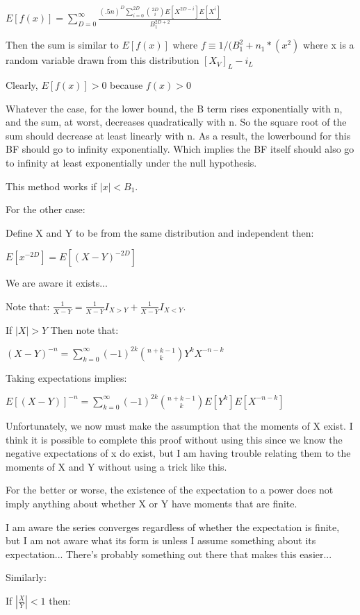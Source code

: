 \documentclass[11pt]{article}
\begin{document}
$E[f(x)] = \sum_{D=0}^\infty \frac{(.5n)^D \sum_{i=0}^{2D} \binom{2D}{i}E[X^{2D-i}]E[X^{i}]}{B_1^{2D+2}}$

Then the sum is similar to $E[f(x)]$ where $f \equiv 1 / (B_1^2 + n_1*(x^2)$ where x is a random variable drawn from this distribution $[X_V]_{L} - i_L$

Clearly, $E[f(x)] > 0$ because $f(x) > 0$

Whatever the case, for the lower bound, the B term rises exponentially with n, and the sum, at worst, decreases quadratically with n. So the square root of the sum should decrease at least linearly with n. As a result, the lowerbound for this BF should go to infinity exponentially. Which implies the BF itself should also go to infinity at least exponentially under the null hypothesis.

This method works if $|x| < B_1$. 

For the other case:

Define X and Y to be from the same distribution and independent then:

$E[x^{-2D}] = E[(X-Y)^{-2D}]$

We are aware it exists...

Note that: $\frac{1}{X-Y} = \frac{1}{X-Y} I_{X > Y} + \frac{1}{X-Y} I_{X < Y}$. 

If $|X| > Y$ Then note that:

$(X - Y)^{-n} = \sum_{k=0}^{\infty} (-1)^{2k} \binom{n+k-1}{k}{Y^k}{X^{-n-k}}$

Taking expectations implies:

$E[(X - Y)]^{-n} = \sum_{k=0}^{\infty} (-1)^{2k} \binom{n+k-1}{k}E[{Y^k}]E[{X^{-n-k}}]$

Unfortunately, we now must make the assumption that the moments of X exist. I think it is possible to complete this proof without using this since we know the negative expectations of x do exist, but I am having trouble relating them to the moments of X and Y without using a trick like this.

For the better or worse, the existence of the expectation to a power does not imply anything about whether X or Y have moments that are finite.

I am aware the series converges regardless of whether the expectation is finite, but I am not aware what its form is unless I assume something about its expectation... There's probably something out there that makes this easier...

Similarly:

If $|\frac{X}  {Y} | < 1$ then:
\end{document}
